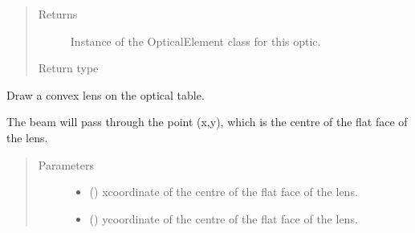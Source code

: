 \documentclass[letterpaper,10pt,english]{sphinxmanual}
\begin{document}
\begin{fulllineitems}
\begin{fulllineitems}
\begin{quote}
\begin{description}
\begin{itemize}
\end{itemize}

\item[{Returns}] \leavevmode
\sphinxAtStartPar
Instance of the OpticalElement class for this optic.

\item[{Return type}] \leavevmode
\sphinxAtStartPar
{\hyperref[\detokenize{index:pyopticaltable.OpticalElement}]{}}

\end{description}\end{quote}

\end{fulllineitems}


\begin{fulllineitems}
\label{\detokenize{index:pyopticaltable.OpticalTable.convex_lens}}
\sphinxAtStartPar
Draw a convex lens on the optical table.

\sphinxAtStartPar
The beam will pass through the point (x,y), which is the centre of the
flat face of the lens.
\begin{quote}\begin{description}
\item[{Parameters}] \leavevmode\begin{itemize}
\item {} 
\sphinxAtStartPar
{} () \textendash{} x\sphinxhyphen{}coordinate of the centre of the flat face of the lens.

\item {} 
\sphinxAtStartPar
{} () \textendash{} y\sphinxhyphen{}coordinate of the centre of the flat face of the lens.


\end{itemize}
\end{description}
\end{quote}
\end{fulllineitems}
\end{fulllineitems}
\end{document}
